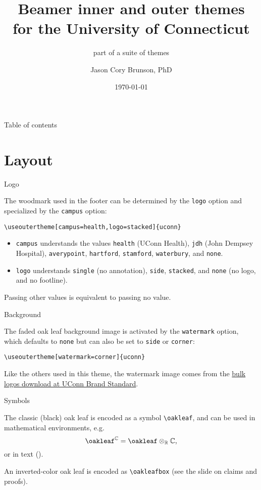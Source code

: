 \documentclass{beamer}
\title[Beamer inner and outer themes for UConn]{Beamer inner and outer themes\\ for the University of Connecticut}
\subtitle{part of a suite of themes}
\author[Cory Brunson]{Jason Cory Brunson, PhD}
\institute[UConn Health]{Center for Quantitative Medicine\\ University of Connecticut School of Medicine}
\date{\today}
\begin{document}
\begin{frame}
\titlepage
\end{frame}


\begin{frame}{Table of contents}
\tableofcontents
\end{frame}


\section{Layout}


\begin{frame}[fragile]{Logo}

The woodmark used in the footer can be determined by the \verb|logo| option and specialized by the \verb|campus| option:

\begin{verbatim}
\useoutertheme[campus=health,logo=stacked]{uconn}
\end{verbatim}

\begin{itemize}
\item \verb|campus| understands the values \verb|health| (UConn Health), \verb|jdh| (John Dempsey Hospital), \verb|averypoint|, \verb|hartford|, \verb|stamford|, \verb|waterbury|, and \verb|none|.
\item \verb|logo| understands \verb|single| (no annotation), \verb|side|, \verb|stacked|, and \verb|none| (no logo, and no footline).
\end{itemize}
Passing other values is equivalent to passing no value.

\end{frame}


\begin{frame}[fragile]{Background}

The faded oak leaf background image is activated by the \verb|watermark| option, which defaults to \verb|none| but can also be set to \verb|side| or \verb|corner|:

\begin{verbatim}
\useoutertheme[watermark=corner]{uconn}
\end{verbatim}

Like the others used in this theme, the watermark image comes from the \href{https://brand.uconn.edu/downloads/logos/}{bulk logos download at UConn Brand Standard}.

\end{frame}


\begin{frame}[fragile]{Symbols}

The classic (black) oak leaf is encoded as a symbol \verb|\oakleaf|, and can be used in mathematical environments, e.g.
\[\oakleaf^{\mathbb{C}}=\oakleaf\otimes_{\mathbb{R}}\mathbb{C}\text,\]
or in text (\oakleaf).

An inverted-color oak leaf is encoded as \verb|\oakleafbox| (see the slide on claims and proofs).

\end{frame}
\end{document}
